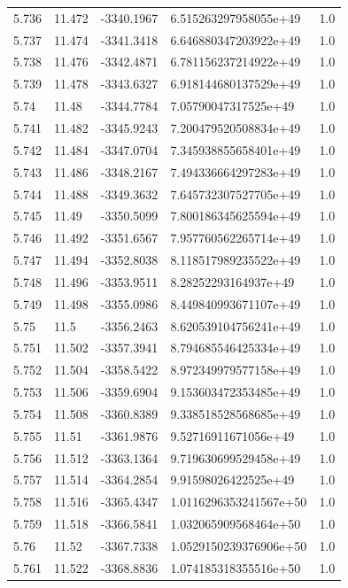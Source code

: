 \begin{tabular}{lllll}
5.736 & 11.472 & -3340.1967 & 6.515263297958055e+49 & 1.0 \\
5.737 & 11.474 & -3341.3418 & 6.646880347203922e+49 & 1.0 \\
5.738 & 11.476 & -3342.4871 & 6.781156237214922e+49 & 1.0 \\
5.739 & 11.478 & -3343.6327 & 6.918144680137529e+49 & 1.0 \\
5.74 & 11.48 & -3344.7784 & 7.05790047317525e+49 & 1.0 \\
5.741 & 11.482 & -3345.9243 & 7.200479520508834e+49 & 1.0 \\
5.742 & 11.484 & -3347.0704 & 7.345938855658401e+49 & 1.0 \\
5.743 & 11.486 & -3348.2167 & 7.494336664297283e+49 & 1.0 \\
5.744 & 11.488 & -3349.3632 & 7.645732307527705e+49 & 1.0 \\
5.745 & 11.49 & -3350.5099 & 7.800186345625594e+49 & 1.0 \\
5.746 & 11.492 & -3351.6567 & 7.957760562265714e+49 & 1.0 \\
5.747 & 11.494 & -3352.8038 & 8.118517989235522e+49 & 1.0 \\
5.748 & 11.496 & -3353.9511 & 8.28252293164937e+49 & 1.0 \\
5.749 & 11.498 & -3355.0986 & 8.449840993671107e+49 & 1.0 \\
5.75 & 11.5 & -3356.2463 & 8.620539104756241e+49 & 1.0 \\
5.751 & 11.502 & -3357.3941 & 8.794685546425334e+49 & 1.0 \\
5.752 & 11.504 & -3358.5422 & 8.972349979577158e+49 & 1.0 \\
5.753 & 11.506 & -3359.6904 & 9.153603472353485e+49 & 1.0 \\
5.754 & 11.508 & -3360.8389 & 9.338518528568685e+49 & 1.0 \\
5.755 & 11.51 & -3361.9876 & 9.52716911671056e+49 & 1.0 \\
5.756 & 11.512 & -3363.1364 & 9.719630699529458e+49 & 1.0 \\
5.757 & 11.514 & -3364.2854 & 9.91598026422525e+49 & 1.0 \\
5.758 & 11.516 & -3365.4347 & 1.0116296353241567e+50 & 1.0 \\
5.759 & 11.518 & -3366.5841 & 1.032065909568464e+50 & 1.0 \\
5.76 & 11.52 & -3367.7338 & 1.0529150239376906e+50 & 1.0 \\
5.761 & 11.522 & -3368.8836 & 1.074185318355516e+50 & 1.0 \\

\end{tabular}

